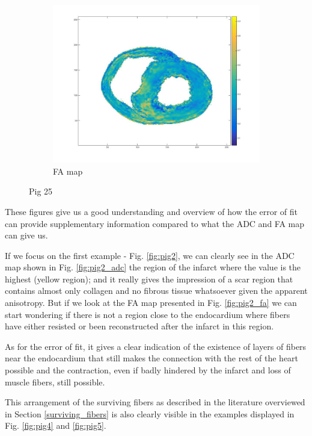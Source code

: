 \begin{figure}[h!]
\begin{subfigure}{.31\textwidth}
        \includegraphics[width=\textwidth]{figures/pig25_fa_30}
        \caption{FA map}
        \label{fig:pig25_fa}
    \end{subfigure}
    \caption{Pig 25}
    \label{fig:pig25}
\end{figure}

These figures give us a good understanding and overview of how the error of fit can provide supplementary information compared to what the ADC and FA map can give us.

If we focus on the first example - Fig. \ref{fig:pig2}, we can clearly see in the ADC map shown in Fig. \ref{fig:pig2_adc} the region of the infarct where the value is the highest (yellow region); and it really gives the impression of a scar region that contains almost only collagen and no fibrous tissue whatsoever given the apparent anisotropy. But if we look at the FA map presented in Fig. \ref{fig:pig2_fa} we can start wondering if there is not a region close to the endocardium where fibers have either resisted or been reconstructed after the infarct in this region.

As for the error of fit, it gives a clear indication of the existence of layers of fibers near the endocardium that still makes the connection with the rest of the heart possible and the contraction, even if badly hindered by the infarct and loss of muscle fibers, still possible.

This arrangement of the surviving fibers as described in the literature overviewed in Section \ref{surviving_fibers} is also clearly visible in the examples displayed in Fig. \ref{fig:pig4} and \ref{fig:pig5}.

